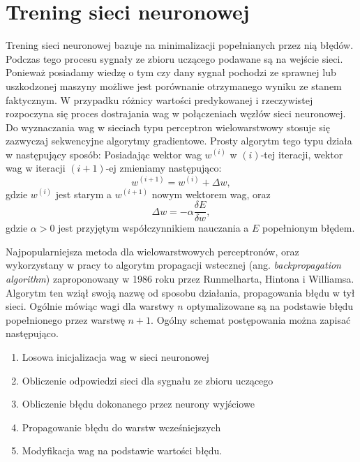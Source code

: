 \documentclass[inzynierska]{pwr_wmat_praca_dyplomowa}
\theoremstyle{plain}
\numberwithin{theorem}{chapter}
\theoremstyle{definition}
\numberwithin{theorem}{chapter}
\begin{document}
\section{Trening sieci neuronowej}

Trening sieci neuronowej bazuje na minimalizacji popełnianych przez nią błędów. Podczas tego procesu sygnały ze zbioru uczącego podawane są na wejście sieci. Ponieważ posiadamy wiedzę o tym czy dany sygnał pochodzi ze sprawnej lub uszkodzonej maszyny możliwe jest porównanie otrzymanego wyniku ze stanem faktycznym. W przypadku różnicy wartości predykowanej i rzeczywistej rozpoczyna się proces dostrajania wag w połączeniach węzłów sieci neuronowej. Do wyznaczania wag w sieciach typu perceptron wielowarstwowy stosuje się zazwyczaj sekwencyjne algorytmy gradientowe. Prosty algorytm tego typu działa w następujący sposób: Posiadając wektor wag $w^{(i)}$ w $(i)$-tej iteracji, wektor wag w iteracji $(i+1)$-ej zmieniamy następująco:
\begin{equation}
	w^{(i+1)} = w^{(i)} + \Delta w,
\end{equation}
gdzie $w^{(i)}$ jest starym a $w^{(i+1)}$ nowym wektorem wag, oraz
\begin{equation}
	\Delta w = -\alpha \frac{\delta E}{\delta w},
\end{equation}
gdzie $\alpha > 0$ jest przyjętym współczynnikiem nauczania a $E$ popełnionym błędem.


Najpopularniejsza metoda dla wielowarstwowych perceptronów, oraz wykorzystany w pracy to algorytm propagacji wstecznej (ang. \textit{backpropagation algorithm})\cite{rumelhart1986learning} zaproponowany w 1986 roku przez Runmelharta, Hintona i Williamsa. Algorytm ten wziął swoją nazwę od sposobu działania, propagowania błędu w tył sieci. Ogólnie mówiąc wagi dla warstwy $n$ optymalizowane są na podstawie błędu popełnionego przez warstwę $n+1$. Ogólny schemat postępowania można zapisać następująco. 
\begin{enumerate}
	\item Losowa inicjalizacja wag w sieci neuronowej
	\item Obliczenie odpowiedzi sieci dla sygnału ze zbioru uczącego
	\item Obliczenie błędu dokonanego przez neurony wyjściowe
	\item Propagowanie błędu do warstw wcześniejszych
	\item Modyfikacja wag na podstawie wartości błędu.
\end{enumerate}
\end{document}
